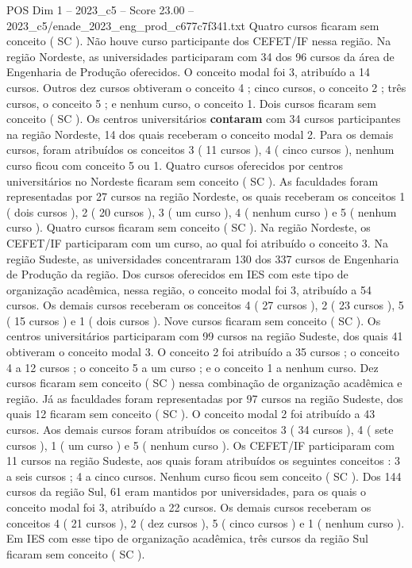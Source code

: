 \begin{textsample}{POS Dim 1 – 2023\_c5 – Score 23.00 – 2023\_c5/enade\_2023\_eng\_prod\_c677c7f341.txt}
Quatro cursos ficaram sem conceito ( SC ).
Não houve curso participante dos CEFET/IF nessa região.
Na região Nordeste, as universidades participaram com 34 dos 96 cursos da área de Engenharia de Produção oferecidos.
O conceito modal foi 3, atribuído a 14 cursos.
Outros dez cursos obtiveram o conceito 4 ; cinco cursos, o conceito 2 ; três cursos, o conceito 5 ; e nenhum curso, o conceito 1.
Dois cursos ficaram sem conceito ( SC ).
Os centros universitários \textbf{contaram} com 34 cursos participantes na região Nordeste, 14 dos quais receberam o conceito modal 2.
Para os demais cursos, foram atribuídos os conceitos 3 ( 11 cursos ), 4 ( cinco cursos ), nenhum curso ficou com conceito 5 ou 1.
Quatro cursos oferecidos por centros universitários no Nordeste ficaram sem conceito ( SC ).
As faculdades foram representadas por 27 cursos na região Nordeste, os quais receberam os conceitos 1 ( dois cursos ), 2 ( 20 cursos ), 3 ( um curso ), 4 ( nenhum curso ) e 5 ( nenhum curso ).
Quatro cursos ficaram sem conceito ( SC ).
Na região Nordeste, os CEFET/IF participaram com um curso, ao qual foi atribuído o conceito 3.
Na região Sudeste, as universidades concentraram 130 dos 337 cursos de Engenharia de Produção da região.
Dos cursos oferecidos em IES com este tipo de organização acadêmica, nessa região, o conceito modal foi 3, atribuído a 54 cursos.
Os demais cursos receberam os conceitos 4 ( 27 cursos ), 2 ( 23 cursos ), 5 ( 15 cursos ) e 1 ( dois cursos ).
Nove cursos ficaram sem conceito ( SC ).
Os centros universitários participaram com 99 cursos na região Sudeste, dos quais 41 obtiveram o conceito modal 3.
O conceito 2 foi atribuído a 35 cursos ; o conceito 4 a 12 cursos ; o conceito 5 a um curso ; e o conceito 1 a nenhum curso.
Dez cursos ficaram sem conceito ( SC ) nessa combinação de organização acadêmica e região.
Já as faculdades foram representadas por 97 cursos na região Sudeste, dos quais 12 ficaram sem conceito ( SC ).
O conceito modal 2 foi atribuído a 43 cursos.
Aos demais cursos foram atribuídos os conceitos 3 ( 34 cursos ), 4 ( sete cursos ), 1 ( um curso ) e 5 ( nenhum curso ).
Os CEFET/IF participaram com 11 cursos na região Sudeste, aos quais foram atribuídos os seguintes conceitos : 3 a seis cursos ; 4 a cinco cursos.
Nenhum curso ficou sem conceito ( SC ).
Dos 144 cursos da região Sul, 61 eram mantidos por universidades, para os quais o conceito modal foi 3, atribuído a 22 cursos.
Os demais cursos receberam os conceitos 4 ( 21 cursos ), 2 ( dez cursos ), 5 ( cinco cursos ) e 1 ( nenhum curso ).
Em IES com esse tipo de organização acadêmica, três cursos da região Sul ficaram sem conceito ( SC ).

\end{textsample}

